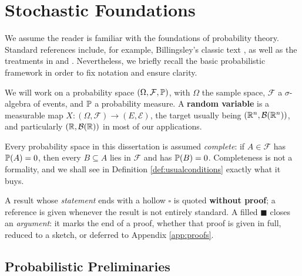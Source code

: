 \chapter{Stochastic Foundations} \label{ch:foundations}

We assume the reader is familiar with the foundations of probability theory. 
Standard references include, for example, Billingsley's classic text 
\cite{billingsley1995}, as well as the treatments in \cite{durrett2019} and \cite{kallenberg2021}. 
Nevertheless, we briefly recall the basic probabilistic framework in order to fix 
notation and ensure clarity.

\medskip

We will work on a probability space $(\Omega,\mathcal{F},\mathbb{P})$, with $\Omega$ the sample space, $\mathcal{F}$ a
$\sigma$-algebra of events, and $\mathbb{P}$ a probability measure. A \textbf{random variable} is a
measurable map $X : (\Omega,\mathcal{F}) \to (E,\mathcal{E})$, the target usually being 
$(\mathbb{R}^n,\mathcal{B}(\mathbb{R}^n))$, and particularly $(\mathbb{R},\mathcal{B}(\mathbb{R}))$ in most of our applications.

\begin{convention*}
Every probability space in this dissertation is assumed \emph{complete}: if $A \in \mathcal{F}$ has
$\mathbb{P}(A)=0$, then every $B \subseteq A$ lies in $\mathcal{F}$ and has $\mathbb{P}(B) = 0$. Completeness is not a formality, and we shall see in Definition \ref{def:usualconditions} exactly
what it buys.
\end{convention*}


\begin{convention*}\label{conv:blacksquare}
A result whose \emph{statement} ends with a hollow $\square$ is quoted \textbf{without proof}; a
reference is given whenever the result is not entirely standard. A filled $\blacksquare$ closes an \emph{argument}: it marks the
end of a proof, whether that proof is given in full, reduced to a sketch, or deferred to Appendix
\ref{app:proofs}.
\end{convention*}

\vspace{-0.3cm}

\section{Probabilistic Preliminaries}\label{sec:preliminaries}

